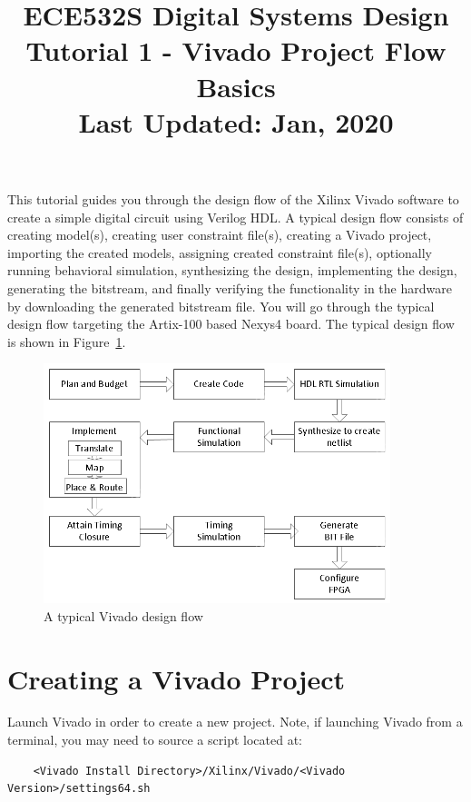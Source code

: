 \documentclass[11pt]{article}
\title{ECE532S Digital Systems Design \\ \vspace{0.4cm}
       \Large Tutorial 1 - Vivado Project Flow Basics \\ \vspace{0.4cm}
       \small Last Updated: Jan, 2020}
\author{ }
\date{ }
\begin{document}
\maketitle
\vspace{-1cm}

This tutorial guides you through the design flow of the Xilinx Vivado software to create a simple digital circuit using Verilog HDL. A typical design flow consists of creating model(s), creating user constraint file(s), creating a Vivado project, importing the created models, assigning created constraint file(s), optionally running behavioral simulation, synthesizing the design, implementing the design, generating the bitstream, and finally verifying the functionality in the hardware by downloading the generated bitstream file. You will go through the typical design flow targeting the Artix-100 based Nexys4 board. The typical design flow is shown in Figure~\ref{fig:design_flow}.

\begin{figure}[!h]
    \centering
    \includegraphics[width=0.9\textwidth]{images/design_flow.png}
    \caption{A typical Vivado design flow}
    \label{fig:design_flow}
\end{figure}




\section{Creating a Vivado Project}
\label{sec:create_proj}
Launch Vivado in order to create a new project. Note, if launching Vivado from a terminal, you may need to source a script located at:

\begin{verbatim}
    <Vivado Install Directory>/Xilinx/Vivado/<Vivado Version>/settings64.sh
\end{verbatim}
\end{document}
